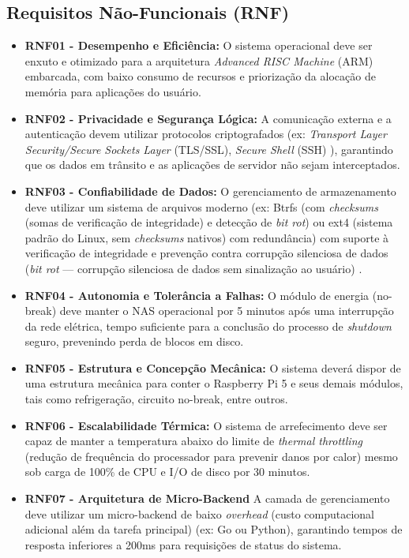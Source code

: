 \documentclass[a4paper,12pt]{article}
\begin{document}
\subsection{Requisitos Não-Funcionais (RNF)}
\begin{itemize}
    \item \textbf{RNF01 - Desempenho e Eficiência:} O sistema operacional deve ser enxuto e otimizado para a arquitetura \textit{Advanced RISC Machine} (ARM) embarcada, com baixo consumo de recursos e priorização da alocação de memória para aplicações do usuário.
    \item \textbf{RNF02 - Privacidade e Segurança Lógica:} A comunicação externa e a autenticação devem utilizar protocolos criptografados (ex: \textit{Transport Layer Security/Secure Sockets Layer} (TLS/SSL), \textit{Secure Shell} (SSH) \cite{rfc4251}), garantindo que os dados em trânsito e as aplicações de servidor não sejam interceptados.
    \item \textbf{RNF03 - Confiabilidade de Dados:} O gerenciamento de armazenamento deve utilizar um sistema de arquivos moderno (ex: Btrfs (com \textit{checksums} (somas de verificação de integridade) e detecção de \textit{bit rot}) ou ext4 (sistema padrão do Linux, sem \textit{checksums} nativos) com redundância) com suporte à verificação de integridade e prevenção contra corrupção silenciosa de dados (\textit{bit rot} — corrupção silenciosa de dados sem sinalização ao usuário) \cite{rodeh2013}.
    \item \textbf{RNF04 - Autonomia e Tolerância a Falhas:} O módulo de energia (no-break) deve manter o NAS operacional por 5 minutos após uma interrupção da rede elétrica, tempo suficiente para a conclusão do processo de \textit{shutdown} seguro, prevenindo perda de blocos em disco.
    \item \textbf{RNF05 - Estrutura e Concepção Mecânica:} O sistema deverá dispor de uma estrutura mecânica para conter o Raspberry Pi 5 e seus demais módulos, tais como refrigeração, circuito no-break, entre outros.
    \item
    \textbf{RNF06 - Escalabilidade Térmica:} O sistema de arrefecimento deve ser capaz de manter a temperatura abaixo do limite de \textit{thermal throttling} (redução de frequência do processador para prevenir danos por calor) mesmo sob carga de 100\% de CPU e I/O de disco por 30 minutos.
    \item \textbf{RNF07 - Arquitetura de Micro-Backend} A camada de gerenciamento deve utilizar um micro-backend de baixo \textit{overhead} (custo computacional adicional além da tarefa principal) (ex: Go ou Python), garantindo tempos de resposta inferiores a 200ms para requisições de status do sistema.
\end{itemize}
\end{document}

